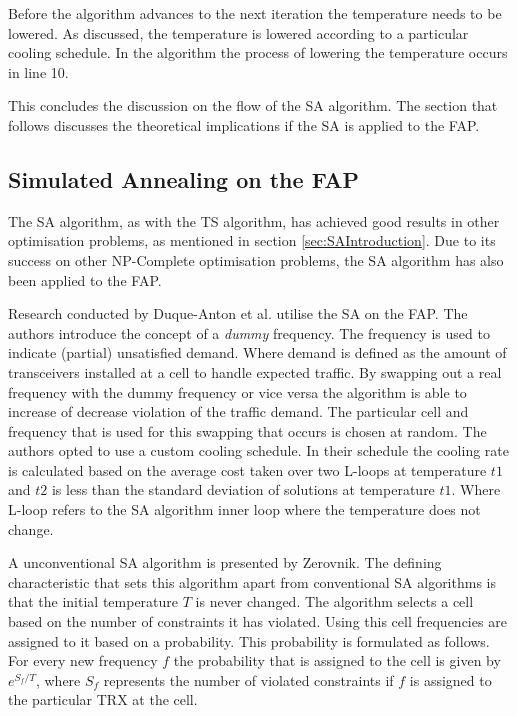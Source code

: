 Before the algorithm advances to the next iteration the temperature needs to be lowered. As discussed, the temperature is lowered according to a particular cooling schedule. In the algorithm the process of lowering the temperature occurs in line 10. 

This concludes the discussion on the flow of the SA algorithm. The section that follows discusses the theoretical implications if the \gls{SA} is applied to the \gls{FAP}.
\subsection{Simulated Annealing on the \gls{FAP}}
\label{sec:saonfap}
The \gls{SA} algorithm, as with the \gls{TS} algorithm, has achieved good results in other optimisation problems, as mentioned in section \ref{sec:SAIntroduction}. Due to its success on other NP-Complete optimisation problems, the \gls{SA} algorithm has also been applied to the \gls{FAP}.

Research conducted by Duque-Anton et al.\cite{SAChanAss} utilise the \gls{SA} on the FAP. The authors introduce the concept of a \emph{dummy} frequency. The frequency is used to indicate (partial) unsatisfied demand. Where demand is defined as the amount of transceivers installed at a cell to handle expected traffic. By swapping out a real frequency with the dummy frequency or vice versa the algorithm is able to increase of decrease violation of the traffic demand. The particular cell and frequency that is used for this swapping that occurs is chosen at random. The authors opted to use a custom cooling schedule. In their schedule the cooling rate is calculated based on the average cost taken over two L-loops at temperature $t1$ and $t2$ is less than the standard deviation of solutions at temperature $t1$. Where L-loop refers to the \gls{SA} algorithm inner loop where the temperature does not change.

A unconventional \gls{SA} algorithm  is presented by Zerovnik\cite{Zerovnik97}. The defining characteristic that sets this algorithm apart from conventional \gls{SA} algorithms is that the initial temperature $T$ is never changed. The algorithm selects a cell based on the number of constraints it has violated. Using this cell frequencies are assigned to it based on a probability. This probability is formulated as follows. For every new frequency $f$ the probability that is assigned to the cell is given by $e^{S_f/T}$, where $S_f$ represents the number of violated constraints if $f$ is assigned to the particular TRX at the cell.

